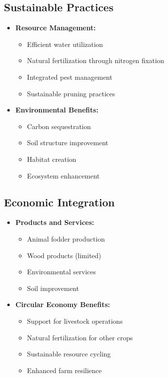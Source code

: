 \subsection{Sustainable Practices}
\begin{itemize}
    \item \textbf{Resource Management:}
    \begin{itemize}
        \item Efficient water utilization
        \item Natural fertilization through nitrogen fixation
        \item Integrated pest management
        \item Sustainable pruning practices
    \end{itemize}
    
    \item \textbf{Environmental Benefits:}
    \begin{itemize}
        \item Carbon sequestration
        \item Soil structure improvement
        \item Habitat creation
        \item Ecosystem enhancement
    \end{itemize}
\end{itemize}

\subsection{Economic Integration}
\begin{itemize}
    \item \textbf{Products and Services:}
    \begin{itemize}
        \item Animal fodder production
        \item Wood products (limited)
        \item Environmental services
        \item Soil improvement
    \end{itemize}
    
    \item \textbf{Circular Economy Benefits:}
    \begin{itemize}
        \item Support for livestock operations
        \item Natural fertilization for other crops
        \item Sustainable resource cycling
        \item Enhanced farm resilience
    \end{itemize}
\end{itemize}
